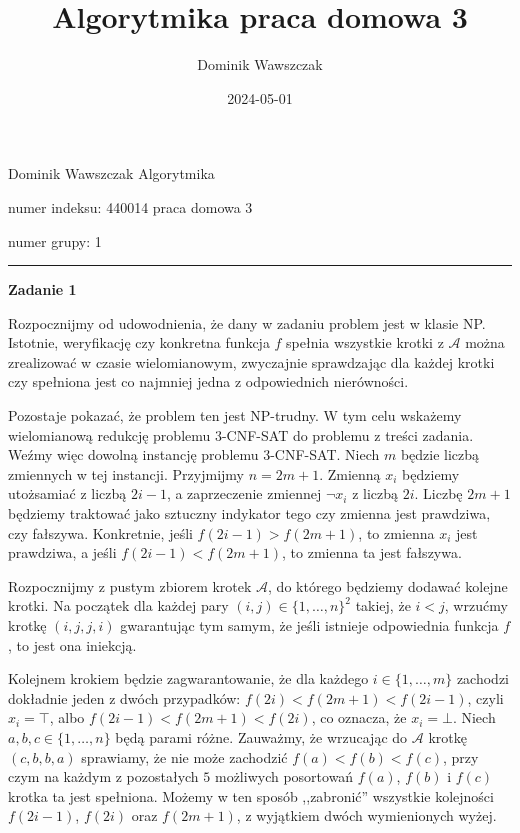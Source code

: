 \documentclass[12pt]{article}
\title{Algorytmika praca domowa 3}
\author{Dominik Wawszczak}
\date{2024-05-01}
\begin{document}
	\setlength{\parindent}{0 cm}
	
	Dominik Wawszczak \hfill Algorytmika
	
	numer indeksu: 440014 \hfill praca domowa 3
	
	numer grupy: 1
	
	\bigskip
	\hrule
	\bigskip
	
	\textbf{Zadanie 1}
	
	\medskip
	
	Rozpocznijmy od udowodnienia, że dany w zadaniu problem jest w klasie NP.
	Istotnie, weryfikację czy konkretna funkcja \(f\) spełnia wszystkie krotki
	z \(\mathcal{A}\) można zrealizować w czasie wielomianowym, zwyczajnie
	sprawdzając dla każdej krotki czy spełniona jest co najmniej jedna z
	odpowiednich nierówności.
	
	\medskip
	
	Pozostaje pokazać, że problem ten jest NP-trudny. W tym celu wskażemy
	wielomianową redukcję problemu 3-CNF-SAT do problemu z treści zadania.
	Weźmy więc dowolną instancję problemu 3-CNF-SAT. Niech \(m\) będzie liczbą
	zmiennych w tej instancji. Przyjmijmy \(n = 2m + 1\). Zmienną \(x_{i}\)
	będziemy utożsamiać z liczbą \(2i - 1\), a zaprzeczenie zmiennej \(\neg
	x_{i}\) z liczbą \(2i\). Liczbę \(2m + 1\) będziemy traktować jako sztuczny
	indykator tego czy zmienna jest prawdziwa, czy fałszywa. Konkretnie, jeśli
	\(f(2i - 1) > f(2m + 1)\), to zmienna \(x_{i}\) jest prawdziwa, a jeśli
	\(f(2i - 1) < f(2m + 1)\), to zmienna ta jest fałszywa.
	
	\medskip
	
	Rozpocznijmy z pustym zbiorem krotek \(\mathcal{A}\), do którego będziemy
	dodawać kolejne krotki. Na początek dla każdej pary \((i, j) \in \{1,
	\ldots, n\}^{2}\) takiej, że \(i < j\), wrzućmy krotkę \((i, j, j, i)\)
	gwarantując tym samym, że jeśli istnieje odpowiednia funkcja \(f\), to jest
	ona iniekcją.
	
	\medskip
	
	Kolejnem krokiem będzie zagwarantowanie, że dla każdego \(i \in \{1, \ldots,
	m\}\) zachodzi dokładnie jeden z dwóch przypadków: \(f(2i) < f(2m + 1) <
	f(2i - 1)\), czyli \(x_{i} = \top\), albo \(f(2i - 1) < f(2m + 1) < f(2i)\),
	co oznacza, że \(x_{i} = \bot\). Niech \(a, b, c \in \{1, \ldots, n\}\) będą
	parami różne. Zauważmy, że wrzucając do \(\mathcal{A}\) krotkę \((c, b, b,
	a)\) sprawiamy, że nie może zachodzić \(f(a) < f(b) < f(c)\), przy czym na
	każdym z pozostałych \(5\) możliwych posortowań \(f(a)\), \(f(b)\) i
	\(f(c)\) krotka ta jest spełniona. Możemy w ten sposób ,,zabronić''
	wszystkie kolejności  \(f(2i - 1)\), \(f(2i)\) oraz \(f(2m + 1)\), z
	wyjątkiem dwóch wymienionych wyżej.
	
\end{document}
